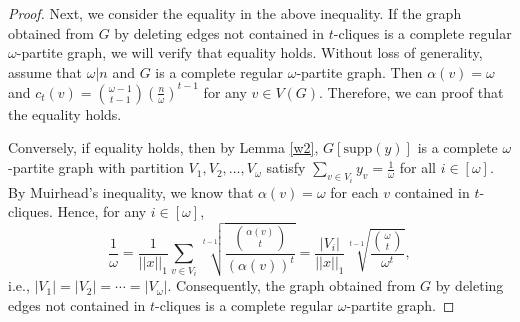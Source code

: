 \documentclass[10pt,a4paper]{amsart}
\begin{document}
\begin{proof}
Next, we consider the equality in the above inequality.
If the graph obtained from $G$ by deleting edges not contained in $t$-cliques is a complete regular $\omega$-partite graph, we will verify that equality holds.
Without loss of generality, assume that $\omega|n$ and $G$ is a complete regular $\omega$-partite graph.
Then $\alpha(v)=\omega$ and $c_t(v)=\binom{\omega-1}{t-1}\left( \frac{n}{\omega} \right)^{t-1}$ for any $v\in V(G)$.
Therefore, we can proof that the equality holds.

Conversely, if equality holds, then by Lemma \ref{w2}, $G[\mathrm{supp}(y)]$ is a complete $\omega$-partite graph with partition $V_1, V_2, \ldots, V_{\omega}$ satisfy $\sum_{v\in V_i}y_v=\frac{1}{\omega}$ for all $i\in[\omega]$.
By Muirhead's inequality, we know that $\alpha(v)=\omega$ for each $v$ contained in $t$-cliques.
Hence, for any $i\in[\omega]$,
$$\frac{1}{\omega}=\frac{1}{||x||_1}\sum_{v\in V_i}\sqrt[t-1]{\frac{\binom{\alpha(v)}{t}}{\left(\alpha(v)\right)^t}}=\frac{|V_i|}{||x||_1}\sqrt[t-1]{\frac{\binom{\omega}{t}}{\omega^t}},$$
i.e., $|V_1|=|V_2|=\cdots=|V_{\omega}|$.
Consequently, the graph obtained from $G$ by deleting edges not contained in $t$-cliques is a complete regular $\omega$-partite graph.
\end{proof}
\end{document}
